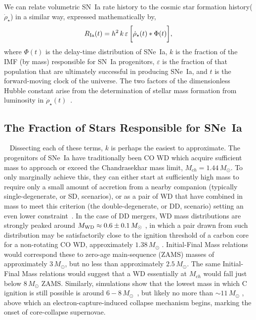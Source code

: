 \documentclass[apj]{aastex62}
\begin{document}
We can relate volumetric SN~Ia rate history to the cosmic star formation history($\dot{\rho}_{\star}$) in a similar way, expressed mathematically by, 
\begin{equation}
R_{\rm Ia}(t) =  h^2\,k\,\varepsilon\,\biggl[\dot{\rho}_{\star}(t) \ast \Phi(t)\biggr],
\label{eqn:std}
\end{equation}
\noindent where $\Phi(t)$ is the delay-time distribution of SNe~Ia, $k$ is the fraction of the IMF (by mass) responsible for SN~Ia progenitors, $\varepsilon$ is the fraction of that population that are ultimately successful in producing SNe~Ia, and $t$ is the forward-moving clock of the universe. The two factors of the dimensionless Hubble constant arise from the determination of stellar mass formation from luminosity in $\dot{\rho}_{\star}(t)$~\citep{Croton:2013ty}.

\subsection{The Fraction of Stars Responsible for SNe~Ia}~\label{sec:wds}
Dissecting each of these terms, $k$ is perhaps the easiest to approximate. The progenitors of SNe~Ia have traditionally been CO WD which acquire sufficient mass to approach or exceed the Chandrasekhar mass limit, $M_{ch}=1.44\,M_{\odot}$. To only marginally achieve this, they can either start at sufficiently high mass to require only a small amount of accretion from a nearby companion (typically single-degenerate, or SD, scenarios), or as a pair of WD that have combined in mass to meet this criterion (the double-degenerate, or DD, scenario) setting an even lower constraint~\cite[see][ for a review]{Maoz:2013}. In the case of DD mergers, WD mass distributions are strongly peaked around $M_{\rm WD}\approx0.6\pm0.1\,M_{\odot}$ \citep{Catalan:2008il}, in which a pair drawn from such distribution may be satisfactorily close to the ignition threshold of a carbon core for a non-rotating CO WD, approximately $1.38\, M_{\odot}$ \citep{Arnett:1969dw, Nomoto:1982vh}. Initial-Final Mass relations \cite[e.g.,][]{Catalan:2008il,Cummings:2018oe} would correspond these to zero-age main-sequence (ZAMS) masses of approximately $3\, M_{\odot}$, but no less than approximately $2.5\, M_{\odot}$. The same Initial-Final Mass relations would suggest that a WD essentially at $M_{ch}$ would fall just below $8\, M_{\odot}$ ZAMS. Similarly, simulations show that the lowest mass in which C ignition is still possible is around $6-8 \,M_{\odot}$~\cite{Chen:2014rb,Denissenkov:2015rf}, but likely no more than $\sim11\, M_{\odot}$ \citep{Takahashi:2013jx}, above which an electron-capture-induced collapse mechanism begins, marking the onset of core-collapse supernovae.
\end{document}
